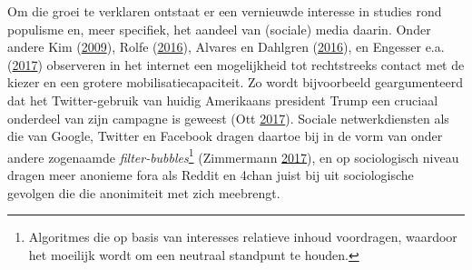 \documentclass[10.5pt,dutch,]{article}
\begin{document}
Om die groei te verklaren ontstaat er een vernieuwde interesse in
studies rond populisme en, meer specifiek, het aandeel van (sociale)
media daarin. Onder andere Kim
(\protect\hyperlink{ref-kimux5fdigitalux5f2009}{2009}), Rolfe
(\protect\hyperlink{ref-rolfeux5freinventionux5f2016}{2016}), Alvares en
Dahlgren (\protect\hyperlink{ref-alvaresux5fpopulismux5f2016}{2016}), en
Engesser e.a.
(\protect\hyperlink{ref-engesserux5fpopulismux5f2017}{2017}) observeren
in het internet een mogelijkheid tot rechtstreeks contact met de kiezer
en een grotere mobilisatiecapaciteit. Zo wordt bijvoorbeeld
geargumenteerd dat het Twitter-gebruik van huidig Amerikaans president
Trump een cruciaal onderdeel van zijn campagne is geweest (Ott
\protect\hyperlink{ref-ottux5fageux5f2017}{2017}). Sociale
netwerkdiensten als die van Google, Twitter en Facebook dragen daartoe
bij in de vorm van onder andere zogenaamde
\emph{filter-bubbles}\footnote{Algoritmes die op basis van interesses
  relatieve inhoud voordragen, waardoor het moeilijk wordt om een
  neutraal standpunt te houden.} (Zimmermann
\protect\hyperlink{ref-zimmermannux5fdigitalux5f2017}{2017}), en op
sociologisch niveau dragen meer anonieme fora als Reddit en 4chan juist
bij uit sociologische gevolgen die die anonimiteit met zich meebrengt.
\end{document}
